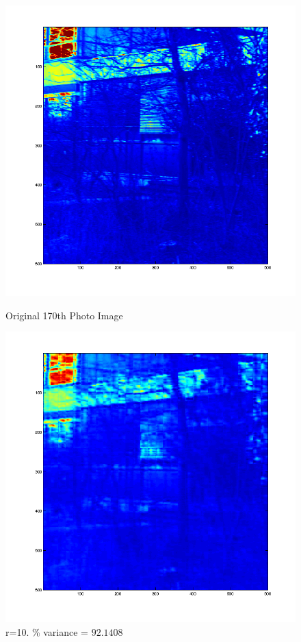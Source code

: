 \documentclass[12pt,english]{article}
\begin{document}
\begin{figure}
\begin{minipage}{0.5\linewidth}
    \includegraphics[width=\linewidth]{pca-part-c-Photo_Images-original.png}
    \caption{Original 170th Photo Image}
\end{minipage}
\begin{minipage}{0.5\linewidth}
    \includegraphics[width=\linewidth]{pca-part-c-Photo_Images-reconstructed-r=10.png}
    \caption{r=10. \% variance = $92.1408$}
\end{minipage}
\end{figure}
\end{document}
